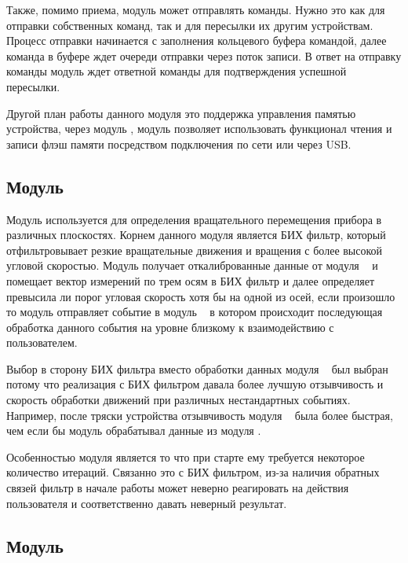Также, помимо приема, модуль может отправлять команды. Нужно это как для отправки собственных команд, так и для пересылки их другим устройствам.
Процесс отправки начинается с заполнения кольцевого буфера командой, далее команда в буфере ждет очереди отправки через поток записи. В ответ на отправку
команды модуль ждет ответной команды для подтверждения успешной пересылки.

Другой план работы данного модуля это поддержка управления памятью устройства, через модуль \moduleFlashMemory , модуль \moduleUart позволяет
использовать функционал чтения и записи флэш памяти посредством подключения по сети или через USB.


\subsection{Модуль \moduleMoveDetect}

Модуль используется для определения вращательного перемещения прибора в различных плоскостях. Корнем данного модуля является
БИХ фильтр, который отфильтровывает резкие вращательные движения и вращения с более высокой угловой скоростью.
Модуль получает откалиброванные данные от модуля \moduleCalib~ и помещает вектор измерений по трем осям в БИХ фильтр
и далее определяет превысила ли порог угловая скорость хотя бы на одной из осей, если произошло то модуль отправляет событие 
в модуль \moduleGraphics~ в котором происходит последующая обработка данного события на уровне близкому к взаимодействию с пользователем.

Выбор в сторону БИХ фильтра вместо обработки данных модуля \moduleOrientationAzimuth~ был выбран потому что реализация 
с БИХ фильтром давала более лучшую отзывчивость и скорость обработки движений при различных нестандартных событиях.
Например, после тряски устройства отзывчивость модуля \moduleMoveDetect~ была более быстрая, чем если бы модуль обрабатывал
данные из модуля \moduleOrientationAzimuth. 

Особенностью модуля является то что при старте ему требуется некоторое количество итераций. Связанно это с БИХ фильтром, из-за наличия
обратных связей фильтр в начале работы может неверно реагировать на действия пользователя и соответственно давать неверный результат.

\subsection{Модуль \moduleOrientationAzimuth}

